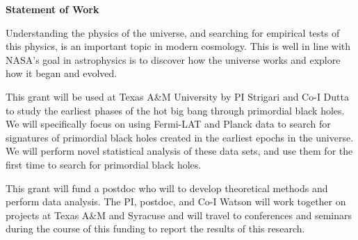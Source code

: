 \documentclass[useAMS,usenatbib,a4paper,11pt]{article}
\date{}
\begin{document}
\bigskip
\noindent 

\begin{center}
{\bf \Large Statement of Work}
\end{center} 

\bigskip 
Understanding the physics of the universe, and searching for empirical tests of this physics, is an important topic in modern cosmology. This is well in line with NASA's goal in astrophysics is to discover how the universe works and explore how it began and evolved. 

\par This grant will be used at Texas A\&M University by PI Strigari and Co-I Dutta to study the earliest phases of the hot big bang through primordial black holes. We will specifically focus on using Fermi-LAT and Planck data to search for signatures of primordial black holes created in the earliest epochs in the universe. We will perform novel statistical analysis of these data sets, and use them for the first time to search for primordial black holes. 

\par This grant will fund a postdoc who will to develop theoretical methods and perform data analysis. The PI, postdoc, and Co-I Watson will work together on projects at Texas A\&M and Syracuse and will travel to conferences and seminars during the course of this funding to report the results of this research.
\end{document}
